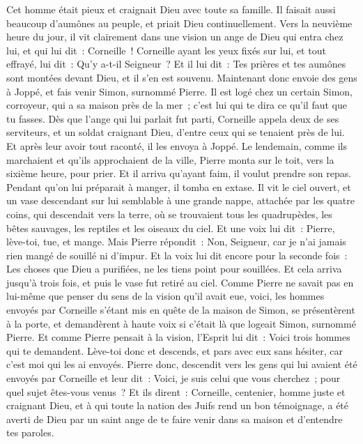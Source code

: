 \begin{multicols}{2}
Cet homme était pieux et craignait Dieu avec toute sa famille. Il faisait aussi beaucoup d'aumônes au peuple, et priait Dieu continuellement.
Vers la neuvième heure du jour, il vit clairement dans une vision un ange de Dieu qui entra chez lui, et qui lui dit~: Corneille~!
Corneille ayant les yeux fixés sur lui, et tout effrayé, lui dit~: Qu'y a-t-il Seigneur~? Et il lui dit~: Tes prières et tes aumônes sont montées devant Dieu, et il s'en est souvenu.
Maintenant donc envoie des gens à Joppé, et fais venir Simon, surnommé Pierre.
Il est logé chez un certain Simon, corroyeur, qui a sa maison près de la mer~; c'est lui qui te dira ce qu'il faut que tu fasses.
Dès que l'ange qui lui parlait fut parti, Corneille appela deux de ses serviteurs, et un soldat craignant Dieu, d'entre ceux qui se tenaient près de lui.
Et après leur avoir tout raconté, il les envoya à Joppé.
Le lendemain, comme ils marchaient et qu'ils approchaient de la ville, Pierre monta sur le toit, vers la sixième heure, pour prier.
Et il arriva qu'ayant faim, il voulut prendre son repas. Pendant qu'on lui préparait à manger, il tomba en extase.
Il vit le ciel ouvert, et un vase descendant sur lui semblable à une grande nappe, attachée par les quatre coins, qui descendait vers la terre,
où se trouvaient tous les quadrupèdes, les bêtes sauvages, les reptiles et les oiseaux du ciel.
Et une voix lui dit~: Pierre, lève-toi, tue, et mange.
Mais Pierre répondit~: Non, Seigneur, car je n'ai jamais rien mangé de souillé ni d'impur.
Et la voix lui dit encore pour la seconde fois~: Les choses que Dieu a purifiées, ne les tiens point pour souillées.
Et cela arriva jusqu'à trois fois, et puis le vase fut retiré au ciel.
Comme Pierre ne savait pas en lui-même que penser du sens de la vision qu'il avait eue, voici, les hommes envoyés par Corneille s'étant mis en quête de la maison de Simon, se présentèrent à la porte,
et demandèrent à haute voix si c'était là que logeait Simon, surnommé Pierre.
Et comme Pierre pensait à la vision, l'Esprit lui dit~: Voici trois hommes qui te demandent.
Lève-toi donc et descends, et pars avec eux sans hésiter, car c'est moi qui les ai envoyés.
Pierre donc, descendit vers les gens qui lui avaient été envoyés par Corneille et leur dit~: Voici, je suis celui que vous cherchez~; pour quel sujet êtes-vous venus~?
Et ils dirent~: Corneille, centenier, homme juste et craignant Dieu, et à qui toute la nation des Juifs rend un bon témoignage, a été averti de Dieu par un saint ange de te faire venir dans sa maison et d'entendre tes paroles.

\end{multicols}
